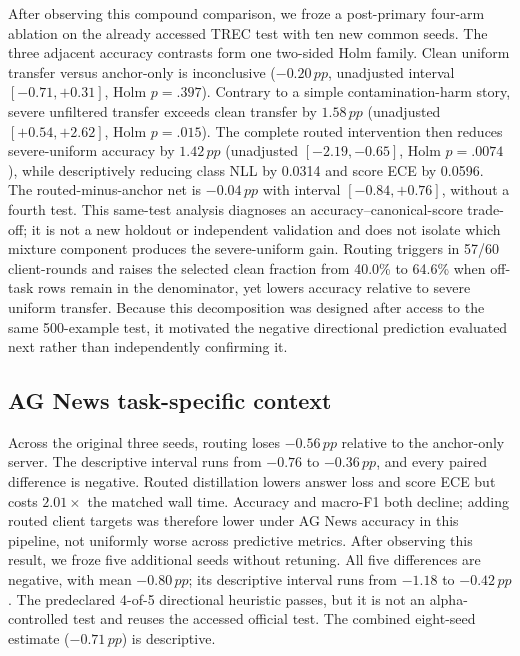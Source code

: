 \documentclass[letterpaper]{article}
\newcommand{\pp}{\,pp}
\begin{document}
After observing this compound comparison, we froze a post-primary four-arm
ablation on the already accessed TREC test with ten new common seeds.  The
three adjacent accuracy contrasts form one two-sided Holm family.  Clean
uniform transfer versus anchor-only is inconclusive
(\(-0.20\pp\), unadjusted interval \([-0.71,+0.31]\), Holm \(p=.397\)).  Contrary to a
simple contamination-harm story, severe unfiltered transfer exceeds clean
transfer by \(1.58\pp\) (unadjusted \([+0.54,+2.62]\), Holm \(p=.015\)).  The complete
routed intervention then reduces severe-uniform accuracy by \(1.42\pp\)
(unadjusted \([-2.19,-0.65]\), Holm \(p=.0074\)), while descriptively reducing class NLL
by 0.0314 and score ECE by 0.0596.  The routed-minus-anchor net is
\(-0.04\pp\) with interval \([-0.84,+0.76]\), without a fourth test.  This
same-test analysis diagnoses an accuracy--canonical-score trade-off; it is not a
new holdout or independent validation and does not isolate which mixture
component produces the severe-uniform gain.
Routing triggers in 57/60 client-rounds and raises the selected clean fraction
from 40.0\% to 64.6\% when off-task rows remain in the denominator, yet lowers
accuracy relative to severe uniform transfer.  Because this decomposition was
designed after access to the same 500-example test, it motivated the negative
directional prediction evaluated next rather than independently confirming it.



\subsection{AG News task-specific context}
Across the original three seeds, routing loses \(-0.56\pp\) relative to the
anchor-only server.  The descriptive interval runs from \(-0.76\) to
\(-0.36\pp\), and every paired difference is negative.  Routed distillation
lowers answer loss and score ECE
but costs \(2.01\times\) the matched wall time.  Accuracy and macro-F1 both
decline; adding routed client targets was therefore lower under AG News
accuracy in this pipeline, not uniformly worse across predictive metrics.
After observing this result, we froze five additional seeds without retuning.
All five differences are negative, with mean
\(-0.80\pp\); its descriptive interval runs from \(-1.18\) to
\(-0.42\pp\).  The
predeclared 4-of-5 directional heuristic passes, but it is not an
alpha-controlled test and reuses the accessed official test.  The combined
eight-seed estimate (\(-0.71\pp\)) is descriptive.
\end{document}
